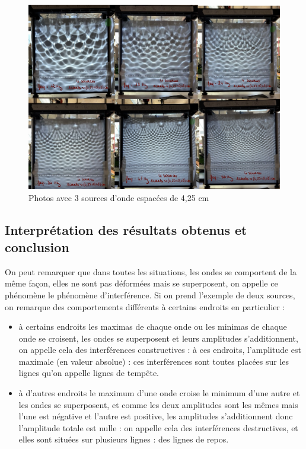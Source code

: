 \documentclass{report}
\begin{document}
\begin{figure}[H]
    \centering
    \includegraphics[scale=0.15]{S4.jpg}
    \caption{Photos avec 3 sources d'onde espacées de 4,25 cm}
    \label{fig:enter-label}
\end{figure}


\subsection{Interprétation des résultats obtenus et conclusion}

On peut remarquer que dans toutes les situations, les ondes se comportent de la même façon, elles ne sont pas déformées mais se superposent, on appelle ce phénomène le phénomène d'interférence. Si on prend l'exemple de deux sources, on remarque des comportements différents à certains endroits en particulier :

\begin{itemize}[label=]
    \item à certains endroits les maximas de chaque onde ou les minimas de chaque onde se croisent, les ondes se superposent et leurs amplitudes s'additionnent, on appelle cela des interférences constructives : à ces endroits, l'amplitude est maximale (en valeur absolue) : ces interférences sont toutes placées sur les lignes qu'on appelle lignes de tempête.
    \item à d'autres endroits le maximum d'une onde croise le minimum d'une autre et les ondes se superposent, et comme les deux amplitudes sont les mêmes mais l'une est négative et l'autre est positive, les amplitudes s'additionnent donc l'amplitude totale est nulle : on appelle cela des interférences destructives, et elles sont situées sur plusieurs lignes : des lignes de repos. \\
\end{itemize}
\end{document}

